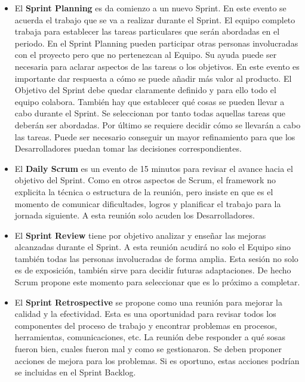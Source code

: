 \begin{itemize}
    \item El \textbf{Sprint Planning} es da comienzo a un nuevo Sprint. En este evento se acuerda el trabajo que se va a realizar durante el Sprint. El equipo completo trabaja para establecer las tareas particulares que serán abordadas en el periodo. En el Sprint Planning pueden participar otras personas involucradas con el proyecto pero que no pertenezcan al Equipo. Su ayuda puede ser necesaria para aclarar aspectos de las tareas o los objetivos.
    En este evento es importante dar respuesta a cómo se puede añadir más valor al producto. El Objetivo del Sprint debe quedar claramente definido y para ello todo el equipo colabora. También hay que establecer qué cosas se pueden llevar a cabo durante el Sprint. Se seleccionan por tanto todas aquellas tareas que deberán ser abordadas. Por último se requiere decidir cómo se llevarán a cabo las tareas. Puede ser necesario conseguir un mayor refinamiento para que los Desarrolladores puedan tomar las decisiones correspondientes.

    \item El \textbf{Daily Scrum} es un evento de 15 minutos para revisar el avance hacia el objetivo del Sprint. Como en otros aspectos de Scrum, el framework no explicita la técnica o estructura de la reunión, pero insiste en que es el momento de comunicar dificultades, logros y planificar el trabajo para la jornada siguiente. A esta reunión solo acuden los Desarrolladores.
    
    \item El \textbf{Sprint Review} tiene por objetivo analizar y enseñar las mejoras alcanzadas durante el Sprint. A esta reunión acudirá no solo el Equipo sino también todas las personas involucradas de forma amplia. Esta sesión no solo es de exposición, también sirve para decidir futuras adaptaciones. De hecho Scrum propone este momento para seleccionar que es lo próximo a completar.
    
    \item El \textbf{Sprint Retrospective} se propone como una reunión para mejorar la calidad y la efectividad. Esta es una oportunidad para revisar todos los componentes del proceso de trabajo y encontrar problemas en procesos, herramientas, comunicaciones, etc. La reunión debe responder a qué sosas fueron bien, cuales fueron mal y como se gestionaron. Se deben proponer acciones de mejora para los problemas. Si es oportuno, estas acciones podrían se incluidas en el Sprint Backlog.
\end{itemize}

